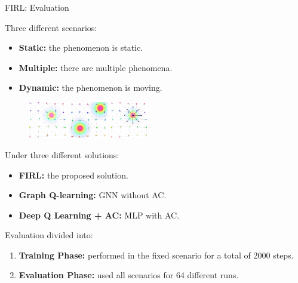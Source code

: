\documentclass[presentation, 8pt,169]{beamer}\mode<presentation>{\usetheme{AMSBolognaFC}}
\begin{document}
\begin{frame}{FIRL: Evaluation}

    Three different scenarios:
    \begin{itemize}
      \item \textbf{Static:} the phenomenon is static.
      \item \textbf{Multiple:} there are multiple phenomena.
      \item \textbf{Dynamic:} the phenomenon is moving.
    \end{itemize}
    \begin{figure}
        \centering
        \includegraphics[width=0.15\textwidth]{img/base}
        \includegraphics[width=0.15\textwidth]{img/two}
        \includegraphics[width=0.15\textwidth]{img/moving}
    \end{figure}

    Under three different solutions:
    \begin{itemize}
      \item \textbf{FIRL:} the proposed solution.
      \item \textbf{Graph Q-learning:} GNN without AC.
      \item \textbf{Deep Q Learning + AC:} MLP with AC.
    \end{itemize}

Evaluation divided into:
  \begin{enumerate}
    \item \textbf{Training Phase:} performed in the fixed scenario for a total of 2000 steps.
    \item \textbf{Evaluation Phase:} used all scenarios for 64 different runs.
  \end{enumerate}
\end{frame}
\end{document}
